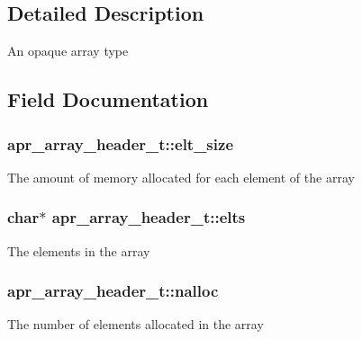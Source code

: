 \subsection{Detailed Description}
An opaque array type 

\subsection{Field Documentation}
\subsubsection[{\texorpdfstring{elt\+\_\+size}{elt_size}}]{ apr\+\_\+array\+\_\+header\+\_\+t\+::elt\+\_\+size}\hypertarget{structapr__array__header__t_a36a690ebc781edc9e99ac1bec53c1770}{}\label{structapr__array__header__t_a36a690ebc781edc9e99ac1bec53c1770}
The amount of memory allocated for each element of the array 
\subsubsection[{\texorpdfstring{elts}{elts}}]{\setlength{\rightskip}{0pt plus 5cm}char$\ast$ apr\+\_\+array\+\_\+header\+\_\+t\+::elts}\hypertarget{structapr__array__header__t_af8462fa2a1ddf6406c66cd3dd441a269}{}\label{structapr__array__header__t_af8462fa2a1ddf6406c66cd3dd441a269}
The elements in the array 
\subsubsection[{\texorpdfstring{nalloc}{nalloc}}]{ apr\+\_\+array\+\_\+header\+\_\+t\+::nalloc}\hypertarget{structapr__array__header__t_a0ceb78a23ebef1bceea5f0cd3e1513b6}{}\label{structapr__array__header__t_a0ceb78a23ebef1bceea5f0cd3e1513b6}
The number of elements allocated in the array 
